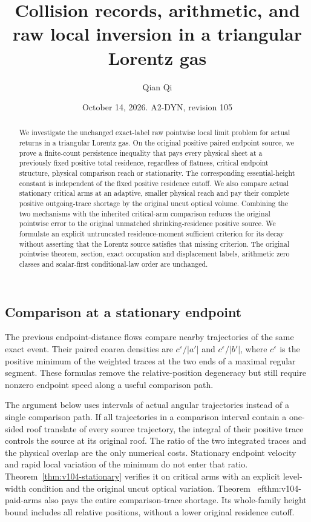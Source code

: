 \documentclass[11pt,reqno]{amsart}
\title[Collision records and raw local inversion]{Collision records, arithmetic, and raw local inversion in a triangular Lorentz gas}
\author{Qian Qi}
\date{October 14, 2026. A2-DYN, revision 105}
\numberwithin{equation}{section}
\theoremstyle{definition}\newtheorem{definition}[theorem]{Definition}
\theoremstyle{remark}\newtheorem{remark}[theorem]{Remark}
\begin{document}
\raggedbottom
\begin{abstract}
We investigate the unchanged exact-label raw pointwise local limit
problem for actual returns in a triangular Lorentz gas. On the
original positive paired endpoint source, we prove a finite-count
persistence inequality that pays every physical sheet at a previously
fixed positive total residence, regardless of flatness, critical
endpoint structure, physical comparison reach or stationarity.
The corresponding essential-height constant is independent of the
fixed positive residence cutoff. We also compare actual stationary
critical arms at an adaptive, smaller physical reach and pay their
complete positive outgoing-trace shortage by the original uncut
optical volume. Combining the two mechanisms with the inherited
critical-arm comparison reduces the original pointwise error
to the original unmatched shrinking-residence positive source.
We formulate an explicit untruncated residence-moment sufficient
criterion for its decay without asserting that the Lorentz source
satisfies that missing criterion. The original pointwise theorem,
section, exact occupation and displacement labels, arithmetic
zero classes and scalar-first conditional-law order are unchanged.
\end{abstract}
\maketitle


\subsection{Comparison at a stationary endpoint}
The previous endpoint-distance flows compare nearby trajectories of
the same exact event. Their paired coarea densities are
$c^\varepsilon/|a'|$ and $c^\varepsilon/|b'|$, where
$c^\varepsilon$ is the positive minimum of the weighted traces at
the two ends of a maximal regular segment. These formulas remove
the relative-position degeneracy but still require nonzero endpoint
speed along a useful comparison path.

The argument below uses intervals of actual angular trajectories
instead of a single comparison path. If all trajectories in a
comparison interval contain a one-sided roof translate of every
source trajectory, the integral of their positive trace controls the
source at its original roof. The ratio of the two integrated traces
and the physical overlap are the only numerical costs. Stationary
endpoint velocity and rapid local variation of the minimum do not
enter that ratio. Theorem~\ref{thm:v104-stationary} verifies it on
critical arms with an explicit level-width condition and the original uncut optical variation. Theorem~
ef{thm:v104-paid-arms}
also pays the entire comparison-trace shortage. Its whole-family
height bound includes all
relative positions, without a lower original residence cutoff.
\end{document}
